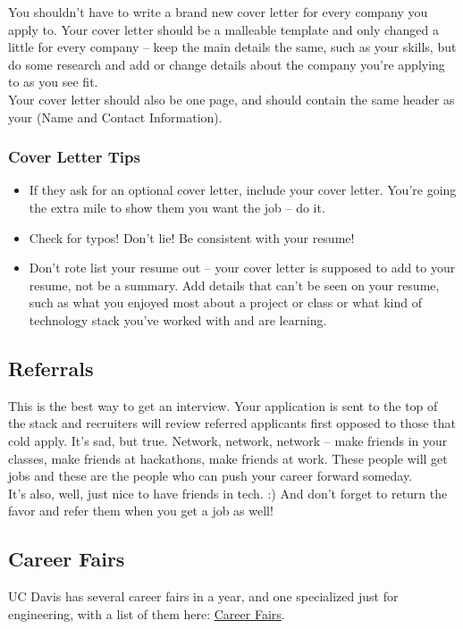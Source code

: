 \documentclass{article}
\begin{document}
You shouldn't have to write a brand new cover letter for every company you apply to. Your cover letter should be a malleable template and only changed a little for every company -- keep the main details the same, such as your skills, but do some research and add or change details about the company you're applying to as you see fit.\\

Your cover letter should also be one page, and should contain the same header as your  (Name and Contact Information).

\subsubsection{Cover Letter Tips}
\begin{itemize}
    \item If they ask for an optional cover letter, include your cover letter. You're going the extra mile to show them you want the job -- do it. 
    \item Check for typos! Don't lie! Be consistent with your resume! 
    \item Don't rote list your resume out -- your cover letter is supposed to add to your resume, not be a summary. Add details that can't be seen on your resume, such as what you enjoyed most about a project or class or what kind of technology stack you've worked with and are learning.
\end{itemize}
\subsection {Referrals}
\label{sec:referrals}
\hspace{0.5cm} This is the best way to get an interview. Your application is sent to the top of the stack and recruiters will review referred applicants first opposed to those that cold apply. It's sad, but true. Network, network, network -- make friends in your classes, make friends at hackathons, make friends at work. These people will get jobs and these are the people who can push your career forward someday.\\

It's also, well, just nice to have friends in tech. :) And don't forget to return the favor and refer them when you get a job as well!  
\subsection{Career Fairs}
\label{sec:careerfair}
\hspace{0.5cm} UC Davis has several career fairs in a year, and one specialized just for engineering, with a list of them here: \href{https://icc.ucdavis.edu/employer/fairs.htm}{Career Fairs}.\\
\end{document}
